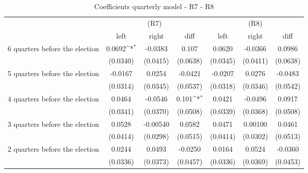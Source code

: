 \begin{table}[!ht]\centering \footnotesize
\def\sym#1{\ifmmode^{#1}\else\(^{#1}\)\fi}
\caption{Coefficients quarterly model - R7 - R8}
\begin{tabular}{l*{6}{c}}
\hline\hline
                    &\multicolumn{3}{c}{(R7)}&\multicolumn{3}{c}{(R8)}\\
&\multicolumn{1}{c}{left}&\multicolumn{1}{c}{right}&\multicolumn{1}{c}{diff}&\multicolumn{1}{c}{left}&\multicolumn{1}{c}{right}&\multicolumn{1}{c}{diff}\\

\hline
 6 quarters before the election&      0.0692\sym{*}  &     -0.0383         &       0.107         &      0.0620         &     -0.0366         &      0.0986         \\
                    &    (0.0340)         &    (0.0415)         &    (0.0638)         &    (0.0345)         &    (0.0411)         &    (0.0638)         \\
[0.5em]
 5 quarters before the election&     -0.0167         &      0.0254         &     -0.0421         &     -0.0207         &      0.0276         &     -0.0483         \\
                    &    (0.0314)         &    (0.0345)         &    (0.0537)         &    (0.0318)         &    (0.0346)         &    (0.0542)         \\
[0.5em]
 4 quarters before the election&      0.0464         &     -0.0546         &       0.101\sym{*}  &      0.0421         &     -0.0496         &      0.0917         \\
                    &    (0.0341)         &    (0.0370)         &    (0.0508)         &    (0.0339)         &    (0.0368)         &    (0.0508)         \\
[0.5em]
 3 quarters before the election&      0.0528         &    -0.00540         &      0.0582         &      0.0471         &     0.00100         &      0.0461         \\
                    &    (0.0414)         &    (0.0298)         &    (0.0515)         &    (0.0414)         &    (0.0302)         &    (0.0513)         \\
[0.5em]
 2 quarters before the election&      0.0244         &      0.0493         &     -0.0250         &      0.0164         &      0.0524         &     -0.0360         \\
                    &    (0.0336)         &    (0.0373)         &    (0.0457)         &    (0.0336)         &    (0.0369)         &    (0.0453)         \\

\end{tabular}
\end{table}
